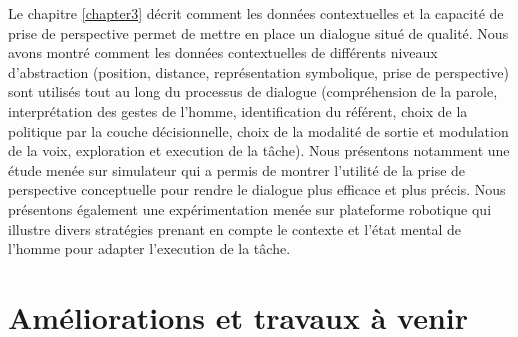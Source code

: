 \documentclass[a4paper,11pt,twoside]{StyleThese}
\begin{document}
Le chapitre \ref{chapter3} décrit comment les données contextuelles et la capacité de prise de perspective permet de mettre en place un dialogue situé de qualité. Nous avons montré comment les données contextuelles de différents niveaux d'abstraction (position, distance, représentation symbolique, prise de perspective) sont utilisés tout au long du processus de dialogue (compréhension de la parole, interprétation des gestes de l'homme, identification du référent, choix de la politique par la couche décisionnelle, choix de la modalité de sortie et modulation de la voix, exploration et execution de la tâche).
Nous présentons notamment une étude menée sur simulateur qui a permis de montrer l'utilité de la prise de perspective conceptuelle pour rendre le dialogue plus efficace et plus précis. Nous présentons également une expérimentation menée sur plateforme robotique qui illustre divers stratégies prenant en compte le contexte et l'état mental de l'homme pour adapter l'execution de la tâche.


\section{Améliorations et travaux à venir}
\ifdefined{}
\else


\end{document}
